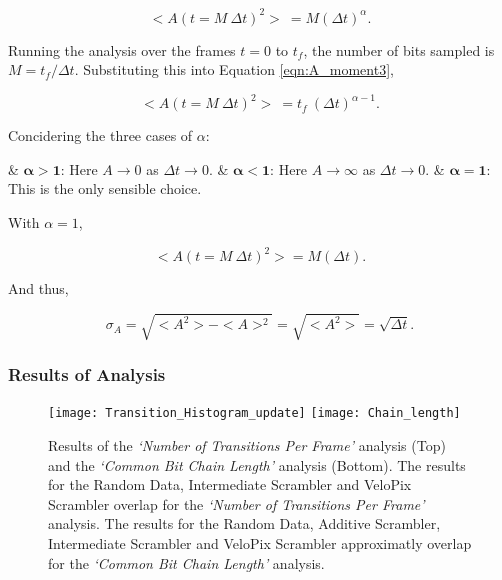 \begin{description}
					\begin{equation}
						<A(t = M\ \Delta t)^2>\ = M (\Delta t)^\alpha.
						\label{eqn:A_moment3}
					\end{equation}

					Running the analysis over the frames $t = 0$ to $t_f$, the number of bits sampled is $M = {t_f / \Delta t}$. Substituting this into Equation \ref{eqn:A_moment3},

					\begin{equation}
						<A(t = M\ \Delta t)^2>\ = t_f\ (\Delta t)^{\alpha -1}.
					\end{equation}

					Concidering the three cases of $\alpha$:

					\begin{easylist}[itemize]
						& $\bm{\alpha > 1}$: Here $A \to 0$ as $\Delta t \to 0$.
						& $\bm{\alpha < 1}$: Here $A \to \infty$ as $\Delta t \to 0$.
						& $\bm{\alpha = 1}$: This is the only sensible choice.
					\end{easylist}

					With $\alpha =1$,

					\begin{equation}
						<A(t = M\ \Delta t)^2> = M (\Delta t).
					\end{equation}

					And thus,

					\begin{equation}
						\sigma_{A} = \sqrt{<A^2> - <A>^2} = \sqrt{<A^2>} = \sqrt{\Delta t}.
					\end{equation}

			\end{description}	

		\newpage
		\subsubsection{Results of Analysis}
			\vspace{-7mm}
			\begin{figure}[h]
				\centering
				\texttt{[image: Transition\_Histogram\_update]}
				\texttt{[image: Chain\_length]}
				\caption{Results of the \textit{`Number of Transitions Per Frame'} analysis (Top) and the \textit{`Common Bit Chain Length'} analysis (Bottom). The results for the Random Data, Intermediate Scrambler and VeloPix Scrambler overlap for the \textit{`Number of Transitions Per Frame'} analysis. The results for the Random Data, Additive Scrambler, Intermediate Scrambler and VeloPix Scrambler approximatly overlap for the \textit{`Common Bit Chain Length'} analysis.}
				\label{fig:transitions_per_frame}
			\end{figure} \FloatBarrier

